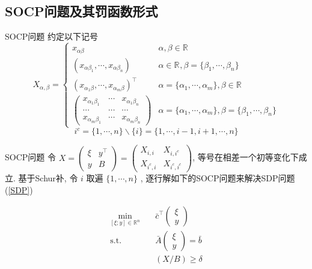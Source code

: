 \documentclass[slidestop, compress, mathserif, UTF8]{beamer}
\numberwithin{equation}{section}                                        %
\begin{document}
		\subsection{SOCP问题及其罚函数形式}
			\begin{frame}[t]{SOCP问题}
				约定以下记号
				\begin{equation}
						X_{\alpha, \beta}
					=
					\begin{cases}
						x_{\alpha \beta}
							&\alpha, \beta \in \mathbb{R}^{}\\
						(x_{\alpha \beta_1}, \cdots, x_{\alpha \beta_n})
							&\alpha \in \mathbb{R}^{}, \beta = \{\beta_1, \cdots, \beta_n\}\\
						(x_{\alpha_1 \beta}, \cdots, x_{\alpha_m \beta})^\top
							&\alpha = \{\alpha_1, \cdots, \alpha_m\}, \beta \in \mathbb{R}^{}\\
						\begin{pmatrix}
							x_{\alpha_1 \beta_1} & \cdots & x_{\alpha_1 \beta_n} \\
							\cdots & \cdots & \cdots\\
							x_{\alpha_m \beta_1} & \cdots & x_{\alpha_m \beta_n}
						\end{pmatrix}
							&\alpha = \{\alpha_1, \cdots, \alpha_m\}, \beta = \{\beta_1, \cdots, \beta_n\}
					\end{cases}
				\end{equation}
				\begin{equation}
						i^c
					=	\{1, \cdots, n\} \backslash \{i\}
					=	\{1, \cdots, i-1, i+1, \cdots, n\}
				\end{equation}
			\end{frame}
			\begin{frame}[t]{SOCP问题}
				令
				$
						X
					=	\begin{pmatrix}
							\xi & y^\top \\
							y & B
						\end{pmatrix}
					=	\begin{pmatrix}
							X_{i, i} & X_{i, i^c} \\
							X_{i^c, i} & X_{i^c, i^c}
						\end{pmatrix}
				$,
				等号在相差一个初等变化下成立. 基于Schur补, 令 $i$ 取遍 $\{1, \cdots, n\}$ , 逐行解如下的SOCP问题来解决SDP问题(\ref{SDP})

				\begin{equation}
					\begin{split}\label{SOCP}
						\min_{[\xi; y] \in \mathbb{R}^{n}} \quad
							& \bar{c}^\top \begin{pmatrix}\xi \\ y\end{pmatrix}\\
						\text{s.t.} \quad
							& \bar{A} \begin{pmatrix}\xi \\ y\end{pmatrix} = \bar{b}\\
							& (X/B) \geq \delta
					\end{split}
				\end{equation}
			\end{frame}
\end{document}
